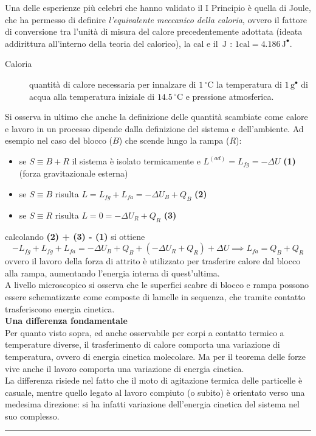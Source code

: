 \documentclass[10pt, oneside]{book}
\newcommand{\celsius}{\, \mathrm{{}^\circ C}}
\newcommand{\joule}[1]{\, \mathrm{J^{#1}}}
\newcommand{\grams}[1]{\, \mathrm{g^{#1}}}
\newcommand{\infobox}[2]{\vspace{0.5cm}~\\ \textbf{#1} \hrulefill \vspace{0.2cm}\\#2 {}\,\\\hrule \vspace{0.5cm}}
\newcommand{\ds}{\displaystyle}
\begin{document}
Una delle esperienze più celebri che hanno validato il I Principio è quella di Joule, che ha permesso di definire \textit{l'equivalente meccanico della caloria}, ovvero il fattore di conversione tra l'unità di misura del calore precedentemente adottata (ideata addirittura all'interno della teoria del calorico), la $\mathrm{cal}$ e il $\joule{}$ : $\ds 1 \mathrm{cal} = 4.186 \joule{•}$.
\begin{description}
\item[Caloria] quantità di calore necessaria per innalzare di $1 \celsius$ la temperatura di $1 \grams{•}$ di acqua alla temperatura iniziale di $14.5 \celsius$ e pressione atmosferica.
\end{description}
Si osserva in ultimo che anche la definizione delle quantità scambiate come calore e lavoro in un processo dipende dalla definizione del sistema e dell'ambiente. Ad esempio nel caso del blocco ($B$) che scende lungo la rampa ($R$):
\begin{itemize}
\item se $S \equiv B + R$ il sistema è isolato termicamente e $L^{(ad)} = L_{fg} = - \Delta U$ \textbf{(1)} (forza gravitazionale esterna)
\item se $S \equiv B$ risulta $L = L_{fg} + L_{fa} = - \Delta U_B + Q_B$ \textbf{(2)}
\item se $S \equiv R$ risulta $L = 0 = - \Delta U_R + Q_R$ \textbf{(3)}
\end{itemize}
calcolando \textbf{(2) + (3) - (1)} si ottiene
\[- L_{fg} + L_{fg} + L_{fa} = - \Delta U_B + Q_B + (- \Delta U_R + Q_R) + \Delta U \implies L_{fa} = Q_B + Q_R\]
ovvero il lavoro della forza di attrito è utilizzato per trasferire calore dal blocco alla rampa, aumentando l'energia interna di quest'ultima.\\
A livello microscopico si osserva che le superfici scabre di blocco e rampa possono essere schematizzate come composte di lamelle in sequenza, che tramite contatto trasferiscono energia cinetica.
\infobox{Una differenza fondamentale}{Per quanto visto sopra, ed anche osservabile per corpi a contatto termico a temperature diverse, il trasferimento di calore comporta una variazione di temperatura, ovvero di energia cinetica molecolare. Ma per il teorema delle forze vive anche il lavoro comporta una variazione di energia cinetica. \\
La differenza risiede nel fatto che il moto di agitazione termica delle particelle è casuale, mentre quello legato al lavoro compiuto (o subito) è orientato verso una medesima direzione: si ha infatti variazione dell'energia cinetica del sistema nel suo complesso.}
\end{document}
